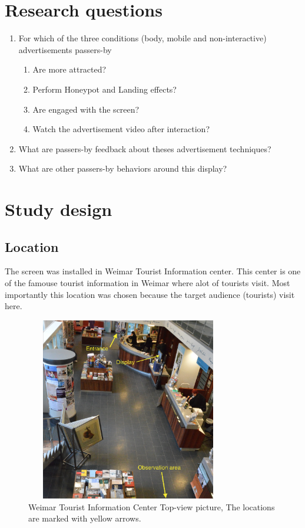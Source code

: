 \section{Research questions}
\begin{enumerate}

\item	For which of the three conditions (body, mobile and non-interactive) advertisements passers-by 

\begin{enumerate}
\item	Are more attracted?
\item	Perform Honeypot and Landing effects?
\item	Are engaged with the screen?
\item	Watch the advertisement video after interaction?
\end{enumerate}

\item	What are passers-by feedback about theses advertisement techniques?
\item   What are other passers-by behaviors around this display?
\end{enumerate}



\newpage
\section{Study design}


\subsection{Location}
The screen was installed in Weimar Tourist Information center. This center is one of the famouse tourist information in Weimar where alot of tourists visit. Most importantly this location was chosen because the target audience (tourists) visit here.

\begin{figure}[H]
    \centering
    \includegraphics[width =0.8\textwidth,height=8cm]{Figures/8/tourist_info}%
    \caption{Weimar Tourist Information Center Top-view picture, The locations are marked with yellow arrows.}%
    \label{fig:Tourist_info_center}%
\end{figure}


